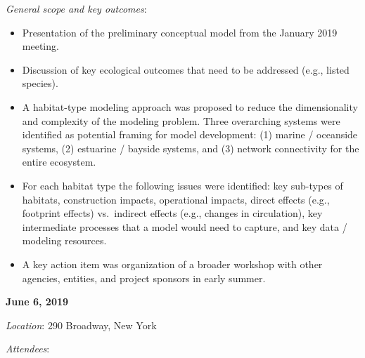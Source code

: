 \documentclass[
]{book}
\providecommand{\tightlist}{%
  \setlength{\itemsep}{0pt}\setlength{\parskip}{0pt}}
\begin{document}
\emph{General scope and key outcomes}:

\begin{itemize}
\tightlist
\item
  Presentation of the preliminary conceptual model from the January 2019 meeting.\\
\item
  Discussion of key ecological outcomes that need to be addressed (e.g., listed species).\\
\item
  A habitat-type modeling approach was proposed to reduce the dimensionality and complexity of the modeling problem. Three overarching systems were identified as potential framing for model development: (1) marine / oceanside systems, (2) estuarine / bayside systems, and (3) network connectivity for the entire ecosystem.\\
\item
  For each habitat type the following issues were identified: key sub-types of habitats, construction impacts, operational impacts, direct effects (e.g., footprint effects) vs.~indirect effects (e.g., changes in circulation), key intermediate processes that a model would need to capture, and key data / modeling resources.\\
\item
  A key action item was organization of a broader workshop with other agencies, entities, and project sponsors in early summer.
\end{itemize}

\textbf{June 6, 2019}

\emph{Location}: 290 Broadway, New York

\emph{Attendees}:
\end{document}

